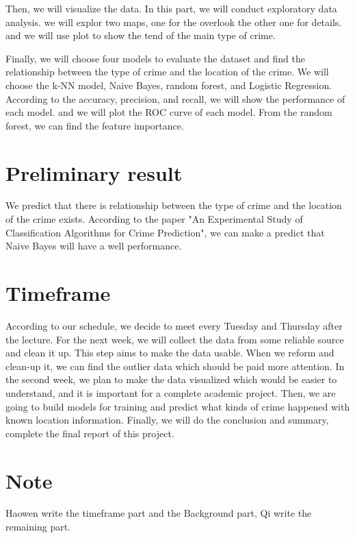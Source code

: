 \documentclass{article}
\begin{document}
Then, we will visualize the data. In this part, we will conduct exploratory data analysis.
we will explor two maps, one for the overlook the other one for details. and we will use plot to show the 
tend of the main type of crime.

Finally, we will choose four models to evaluate the dataset and find the relationship between the type of crime and the location of the crime. We will choose the k-NN model, Naive Bayes, random forest, and  Logistic Regression. According to the accuracy, precision, and recall, we will show the performance of each model. and we will plot the ROC curve of each model. From the random forest, we can find the feature importance.
\section{Preliminary result}

We predict that there is relationship between the type of crime and the location of the crime exists.
According to the paper "An Experimental Study of Classification Algorithms for Crime Prediction", we can make a predict that Naive Bayes will have a well performance.\cite{iqbal2013experimental}

\section{Timeframe}
According to our schedule, we decide to meet every Tuesday and Thursday after the lecture. For the next week, we will collect the data from some reliable source and clean it up. This step aims to make the data usable. When we reform and clean-up it, we can find the outlier data which should be paid more attention. In the second week, we plan to make the data visualized which would be easier to understand, and it is important for a complete academic project. Then, we are going to build models for training and predict what kinds of crime happened with known location information. Finally, we will do the conclusion and summary, complete the final report of this project.

\section{Note}
Haowen write the timeframe part and the Background part, Qi write the remaining part.


\end{document}
